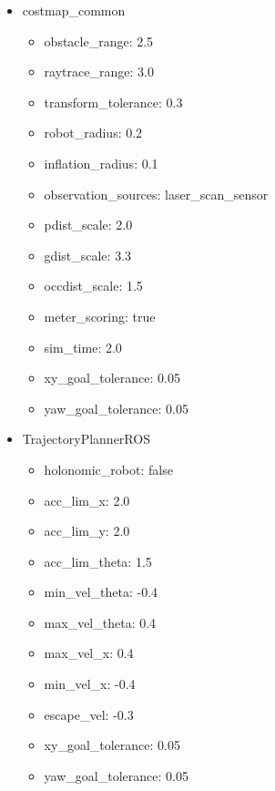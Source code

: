 \documentclass[10pt,journal,compsoc]{IEEEtran}
\begin{document}
\begin{itemize}
\item costmap\_common
\begin{itemize}
\item obstacle\_range: 2.5
\item raytrace\_range: 3.0

\item transform\_tolerance: 0.3

\item robot\_radius: 0.2
\item inflation\_radius: 0.1

\item observation\_sources: laser\_scan\_sensor

\item pdist\_scale: 2.0
\item gdist\_scale: 3.3
\item occdist\_scale: 1.5

\item meter\_scoring: true

\item sim\_time: 2.0


\item xy\_goal\_tolerance: 0.05
\item yaw\_goal\_tolerance: 0.05

\end{itemize}


\item TrajectoryPlannerROS
\begin{itemize}
\item   holonomic\_robot: false
 \item  acc\_lim\_x: 2.0
  \item acc\_lim\_y: 2.0

 \item  acc\_lim\_theta: 1.5

  \item min\_vel\_theta: -0.4
  \item max\_vel\_theta: 0.4

  \item max\_vel\_x: 0.4
  \item min\_vel\_x: -0.4
  
  \item escape\_vel: -0.3
  

  \item xy\_goal\_tolerance: 0.05
  \item yaw\_goal\_tolerance: 0.05
\end{itemize}

\end{itemize}
\end{document}
